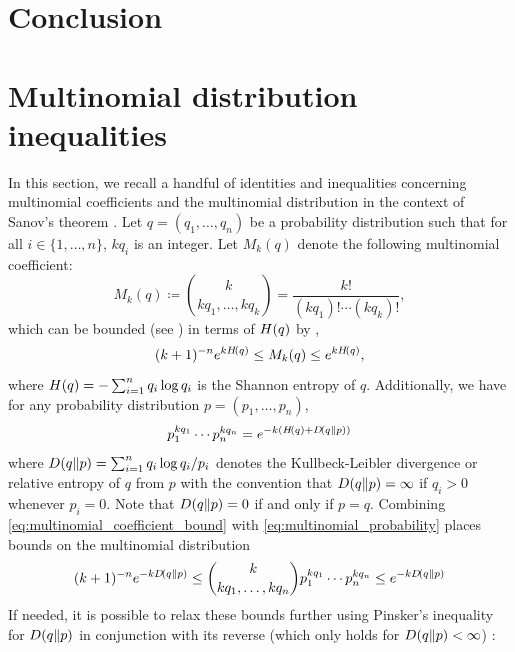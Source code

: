 \documentclass[notitlepage, 10pt]{article}
\begin{document}
\section{Conclusion}


\clearpage
\appendix

\section{Multinomial distribution inequalities}

In this section, we recall a handful of identities and inequalities concerning multinomial coefficients and the multinomial distribution in the context of Sanov's theorem \cite[Chapter 2]{dembo2010large}.
Let $q = (q_1,\ldots, q_n)$ be a probability distribution such that for all $i \in \{1, \ldots, n\}$, $k q_i$ is an integer. 
Let $M_{k}(q)$ denote the following multinomial coefficient:
\begin{equation}
    \label{eq:multinomial_coefficient}
    M_{k}(q) \coloneqq \binom{k}{kq_1, \ldots, kq_k} = \frac{k!}{(kq_1)!\cdots (kq_k)!},
\end{equation}
which can be bounded (see \cite[Lemma 2.1.8]{dembo2010large}) in terms of $H\!\left(q\right)$ by ,
\begin{equation}
    \label{eq:multinomial_coefficient_bound}
    (k+1)^{-n} e^{k H\!\left(q\right)} \leq M_{k}(q) \leq e^{k H\!\left(q\right)},
\end{equation}
where $H\!\left(q\right) = - \sum_{i=1}^{n} q_i \log q_i$ is the Shannon entropy of $q$.
Additionally, we have for any probability distribution $p = (p_1, \ldots, p_n)$,
\begin{equation}
    \label{eq:multinomial_probability}
    p_1^{kq_1} \cdots p_n^{kq_n} = e^{-k \left(H\!\left(q\right) + D\!\left(q\middle\|p\right)\right)}
\end{equation}
where $D\!\left(q\middle\|p\right) = \sum_{i=1}^{n} q_i \log q_i/p_i$ denotes the Kullbeck-Leibler divergence or relative entropy of $q$ from $p$ with the convention that $D\!\left(q\middle\|p\right) = \infty$ if $q_i > 0$ whenever $p_i=0$.
Note that $D\!\left(q\middle\|p\right) = 0$ if and only if $p=q$.
Combining \cref{eq:multinomial_coefficient_bound} with \cref{eq:multinomial_probability} places bounds on the multinomial distribution
\begin{equation}
    (k+1)^{-n} e^{-k D\!\left(q\middle\|p\right)} \leq \binom{k}{kq_1, \ldots, kq_n} p_1^{kq_1} \cdots p_n^{kq_n} \leq e^{-k D\!\left(q\middle\|p\right)}
\end{equation}
If needed, it is possible to relax these bounds further using Pinsker's inequality for $D\!\left(q\middle\|p\right)$ in conjunction with its reverse (which only holds for $D\!\left(q\middle\|p\right) < \infty$) \cite{gotze2019higher}:
\end{document}
